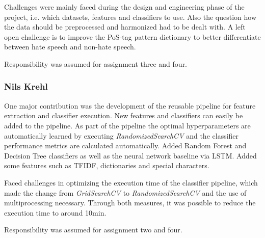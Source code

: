 Challenges were mainly faced during the design and engineering phase of the project, i.e. which datasets, features and classifiers to use. Also the question how the data should be preprocessed and harmonized had to be dealt with. A left open challenge is to improve the PoS-tag pattern dictionary to better differentiate between hate speech and non-hate speech. 

Responsibility was assumed for assignment three and four.

\subsubsection*{Nils Krehl}

One major contribution was the development of the reusable pipeline for feature extraction and classifier execution. New features and classifiers can easily be added to the pipeline. As part of the pipeline the optimal hy\-per\-pa\-ra\-me\-ters are automatically learned by executing \textit{RandomizedSearchCV} and the classifier performance metrics are calculated automatically. Added Random Forest and Decision Tree classifiers as well as the neural network baseline via LSTM. Added some features such as TFIDF, dictionaries and special characters.

Faced challenges in optimizing the execution time of the classifier pipeline, which made the change from \textit{GridSearchCV} to \textit{RandomizedSearchCV} and the use of multiprocessing necessary. Through both measures, it was possible to reduce the execution time to around 10min.

Responsibility was assumed for assignment two and four.
